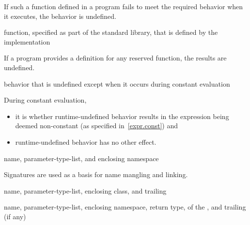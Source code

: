 \begin{defnote}
If such a function defined in a \Cpp{} program fails to meet the required
behavior when it executes, the behavior is undefined.%
\end{defnote}

%
function, specified as part of the \Cpp{} standard library, that is defined by the
implementation

\begin{defnote}
If a \Cpp{} program provides a definition for any reserved function, the results are undefined.%
\end{defnote}

%
behavior that is undefined except when it occurs during constant evaluation

\begin{defnote}
During constant evaluation,
\begin{itemize}
\item
it is
whether runtime-undefined behavior results in the expression being deemed non-constant
(as specified in~\ref{expr.const}) and
\item
runtime-undefined behavior has no other effect.
\end{itemize}
\end{defnote}

%
name,
parameter-type-list,
and enclosing namespace

\begin{defnote}
Signatures are used as a basis for
name mangling and linking.
\end{defnote}

%
name,
parameter-type-list,
enclosing class,
and
trailing 

%
name,
parameter-type-list,
enclosing namespace,
return type,
 of the ,
and
trailing  (if any)

